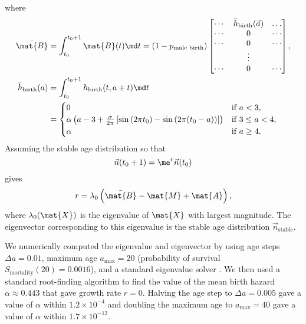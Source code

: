 \documentclass{jpmarticle}
\begin{document}
where
\begin{equation}
  \begin{split}
    \bar{\mat{B}} &=
    \int_{t_0}^{t_0 + 1} \mat{B}(t) \md t =
    (1 - p_{\text{male birth}})
    \begin{bmatrix}
      \cdots & \bar{h}_{\text{birth}}(\vec{a}) & \dots
      \\
      \cdots & 0 & \cdots
      \\
      \cdots & 0 & \cdots
      \\
      & \vdots &
      \\
      \cdots & 0 & \cdots
    \end{bmatrix},
    \\
    \bar{h}_{\text{birth}}(a) &=
    \int_{t_0}^{t_0 + 1} h_{\text{birth}}(t, a + t) \md t
    \\
    &=
    \begin{cases}
      0 & \text{if $a < 3$},
      \\
      \alpha \left(
        a - 3 + \frac{\sigma}{2 \pi}
        \left[
          \sin\left(2\pi t_0\right)
          - \sin\left(2 \pi (t_0 - a)\right)
        \right]
      \right)
      & \text{if $3 \leq a < 4$},
      \\
      \alpha & \text{if $a \geq 4$}.
    \end{cases}
  \end{split}
\end{equation}
Assuming the stable age distribution so that
\begin{equation}
  \vec{n}(t_0 + 1) = \me^r \vec{n}(t_0)
\end{equation}
gives
\begin{equation}
  r = \lambda_0\left(\bar{\mat{B}} - \mat{M} + \mat{A}\right),
\end{equation}
where $\lambda_0(\mat{X})$ is the eigenvalue of $\mat{X}$ with largest
magnitude.  The eigenvector corresponding to this eigenvalue is the
stable age distribution $\vec{n}_{\text{stable}}$.

We numerically computed the eigenvalue and eigenvector by using age
steps $\Delta a = 0.01$, maximum age $a_{\text{max}} = 20$
(probability of survival $S_{\text{mortality}}(20) = 0.0016$), and a
standard eigenvalue solver
\citep[\texttt{numpy.linalg.eig},][]{scipy}.  We then used a standard
root-finding algorithm
\citep[\texttt{scipy.optimize.fsolve},][]{scipy} to find the value of
the mean birth hazard $\alpha \approx 0.443$ that gave growth rate
$r = 0$.  Halving the age step to $\Delta a = 0.005$ gave a value of
$\alpha$ within $1.2 \times 10^{-4}$ and doubling the maximum age to
$a_{\text{max}} = 40$ gave a value of $\alpha$ within
$1.7 \times 10^{-12}$.
\end{document}
